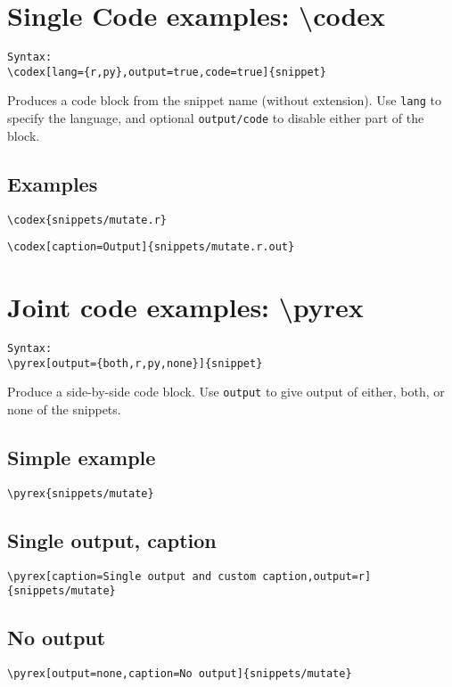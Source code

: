 \documentclass{article}
\begin{document}
\section{Single Code examples: \textbackslash codex}

\begin{verbatim}
Syntax:
\codex[lang={r,py},output=true,code=true]{snippet}
\end{verbatim}

Produces a code block from the snippet name (without extension).
Use \verb+lang+ to specify the language, and optional \verb+output/code+ to disable either part of the block.

\subsection*{Examples}

\verb+\codex{snippets/mutate.r}+


\verb+\codex[caption=Output]{snippets/mutate.r.out}+

\newpage

\section{Joint code examples: \textbackslash pyrex}


\begin{verbatim}
Syntax:
\pyrex[output={both,r,py,none}]{snippet}
\end{verbatim}

Produce a side-by-side code block. Use \verb+output+ to give output of either, both, or none of the snippets. 

\subsection*{Simple example}

\verb+\pyrex{snippets/mutate}+

\newpage
\subsection*{Single output, caption}

\verb+\pyrex[caption=Single output and custom caption,output=r]{snippets/mutate}+


\newpage
\subsection*{No output}

\verb+\pyrex[output=none,caption=No output]{snippets/mutate}+
\end{document}
